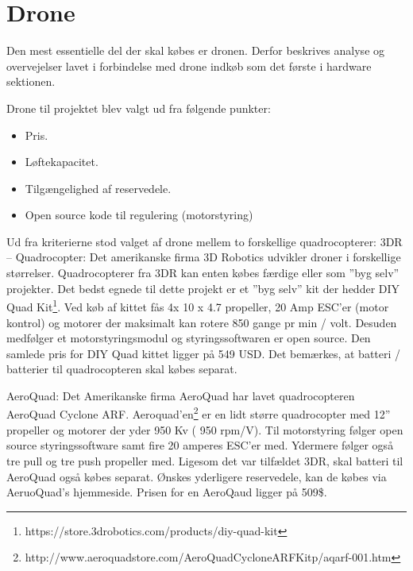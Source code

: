 \section{Drone}

Den mest essentielle del der skal købes er dronen. Derfor beskrives analyse og overvejelser lavet i forbindelse med drone indkøb som det første i hardware sektionen. 
  
Drone til projektet blev valgt ud fra følgende punkter:
\begin{itemize}
	\item Pris.
	\item Løftekapacitet. 
	\item Tilgængelighed af reservedele. 
	\item Open source kode til regulering (motorstyring)
\end{itemize}

\vspace{0.5cm}

Ud fra kriterierne stod valget af drone mellem to forskellige quadrocopterer: 
3DR – Quadrocopter:  Det amerikanske firma 3D Robotics udvikler droner i forskellige størrelser. Quadrocopterer fra 3DR kan enten købes færdige eller som ”byg selv” projekter. Det bedst egnede til dette projekt er et ”byg selv” kit der hedder DIY Quad Kit\footnote{https://store.3drobotics.com/products/diy-quad-kit}. Ved køb af kittet fås 4x 10 x 4.7 propeller, 20 Amp ESC’er (motor kontrol) og motorer der maksimalt kan rotere 850 gange pr min / volt.  Desuden medfølger et motorstyringsmodul og styringssoftwaren er open source. Den samlede pris for DIY Quad kittet ligger på 549 USD. Det bemærkes, at batteri / batterier til quadrocopteren skal købes separat.

AeroQuad: Det Amerikanske firma AeroQuad har lavet quadrocopteren AeroQuad Cyclone ARF. Aeroquad'en\footnote{http://www.aeroquadstore.com/AeroQuad\textunderscore Cyclone\textunderscore ARF\textunderscore Kit\textunderscore p/aqarf-001.htm} er en lidt større quadrocopter med 12” propeller og motorer der yder 950 Kv ( 950 rpm/V). Til motorstyring følger open source styringssoftware samt fire 20 amperes ESC'er med. Ydermere følger også tre pull og tre push propeller med. \newline Ligesom det var tilfældet 3DR, skal batteri til AeroQuad også købes separat. Ønskes yderligere reservedele, kan de købes via AeruoQuad’s hjemmeside. Prisen for en AeroQaud ligger på 509\$.

